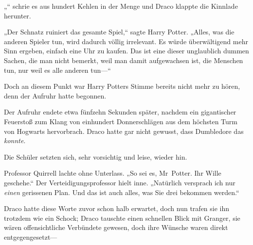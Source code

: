 „“ schrie es aus hundert Kehlen in der Menge und Draco klappte die Kinnlade herunter.

„Der Schnatz ruiniert das gesamte Spiel,“ sagte Harry Potter. „Alles, was die anderen Spieler tun, wird dadurch völlig irrelevant. Es würde überwältigend mehr Sinn ergeben, einfach eine Uhr zu kaufen. Das ist eine dieser unglaublich dummen Sachen, die man nicht bemerkt, weil man damit aufgewachsen ist, die Menschen tun, nur weil es alle anderen tun—“

Doch an diesem Punkt war Harry Potters Stimme bereits nicht mehr zu hören, denn der Aufruhr hatte begonnen.

\later

Der Aufruhr endete etwa fünfzehn Sekunden später, nachdem ein gigantischer Feuerstoß zum Klang von einhundert Donnerschlägen aus dem höchsten Turm von Hogwarts hervorbrach. Draco hatte gar nicht gewusst, dass Dumbledore das \emph{konnte}.

Die Schüler setzten sich, sehr vorsichtig und leise, wieder hin.

Professor Quirrell lachte ohne Unterlass. „So sei es, Mr~Potter. Ihr Wille geschehe.“ Der Verteidigungsprofessor hielt inne. „Natürlich versprach ich nur \emph{einen} gerissenen Plan. Und das ist auch alles, was Sie drei bekommen werden.“

Draco hatte diese Worte zuvor schon halb erwartet, doch nun trafen sie ihn trotzdem wie ein Schock; Draco tauschte einen schnellen Blick mit Granger, sie wären offensichtliche Verbündete gewesen, doch ihre Wünsche waren direkt entgegengesetzt—

